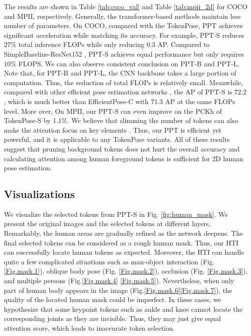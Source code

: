 \documentclass[runningheads]{llncs}
\begin{document}
The results are shown in Table \ref{tab:coco_val} and Table \ref{tab:mpii_2d} for COCO and MPII, respectively. 
Generally, the transformer-based methods \cite{li2021tokenpose,yang2020transpose} maintain less number of parameters. 
On COCO, compared with the TokenPose, PPT achieves significant acceleration while matching its accuracy. 
For example, PPT-S reduces 27\% total inference FLOPs while only reducing $0.3$ AP. Compared to SimpleBaseline-ResNet152 \cite{xiao2018simple}, PPT-S achieves equal performance but only requires $10\%$ FLOPS. 
We can also observe consistent conclusion on PPT-B and PPT-L. 
Note that, for PPT-B and PPT-L, the CNN backbone takes a large portion of computation. Thus, the reduction of total FLOPs is relatively small. 
Meanwhile, compared with other efficient pose estimation networks \cite{yu2021lite,zhang2021efficientpose}, the AP of PPT-S is $72.2$, which is much better than EfficientPose-C \cite{zhang2021efficientpose}  with $71.3$ AP at the same FLOPs level. 
More over, On MPII, our PPT-S can even improve on the PCKh of TokenPose-S by 1.1\%. 
We believe that slimming the number of tokens can also make the attention focus on key elements \cite{zhu2020deformable}. 
Thus, our PPT is efficient yet powerful, and it is applicable to any TokenPose variants. 
All of these results suggest that pruning background tokens does not hurt the overall accuracy and calculating attention among human foreground tokens is sufficient for 2D human pose estimation. 








\vspace{-0.5em}
\subsection{Visualizations}
\vspace{-0.5em}

We visualize the selected tokens from PPT-S in Fig. \ref{fig:human_mask}. We present the original images and the selected tokens at different layers.  
Remarkably, the human areas are gradually refined as the network deepens. The final selected tokens can be considered as a rough human mask. Thus, our HTI can successfully locate human tokens as expected. 
Moreover, the HTI can handle quite a few complicated situations such as man-object interaction (Fig.\ref{Fig.mask.1}), oblique body pose (Fig. \ref{Fig.mask.2}), occlusion (Fig. \ref{Fig.mask.3}), and multiple persons (Fig.\ref{Fig.mask.4} \ref{Fig.mask.5}). 
Nevertheless, when only part of human body appears in the image (Fig.\ref{Fig.mask.6}\ref{Fig.mask.7}), the quality of the located human mask could be imperfect. 
In these cases, we hypothesize that some keypoint tokens such as ankle and knee cannot locate the corresponding joints as they are invisible. Thus, they may just give equal attention score, which leads to inaccurate token selection. 
\end{document}
